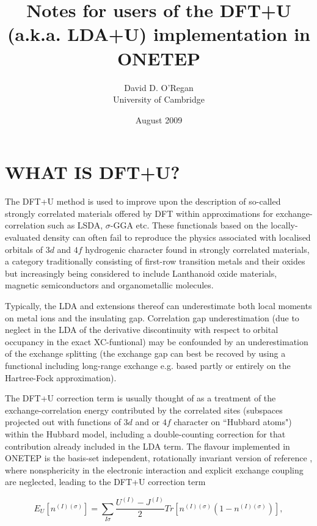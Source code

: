 \documentclass[a4paper,oneside,11pt]{article}
\numberwithin{equation}{section}
\begin{document}
\title{Notes for users of the DFT+U (a.k.a. LDA+U) implementation in ONETEP}
\author{David D. O'Regan \\  University of Cambridge}
\date{August 2009}

\maketitle

\section*{WHAT IS DFT+U?}

The DFT+U method \cite{Anisimov91,Anisimov97, Dudarev} is used to improve upon the description
of so-called strongly correlated materials offered by DFT within  
approximations for exchange-correlation such as LSDA, $\sigma$-GGA etc.
These functionals based on the locally-evaluated density can 
often fail to reproduce the physics associated with localised
orbitals of $3d$ and $4f$ hydrogenic character found in strongly 
correlated materials, a category traditionally consisting of first-row 
transition metals and their oxides but increasingly being considered to include
Lanthanoid oxide materials, magnetic semiconductors and
organometallic molecules. 

Typically, the LDA and extensions thereof
can underestimate both local moments on metal ions and the insulating gap. Correlation gap underestimation 
(due to neglect in the LDA of the derivative discontinuity 
with respect to orbital occupancy in the exact XC-funtional)
may be confounded by an underestimation of the exchange splitting
(the exchange gap can best be recoved by using a functional including
long-range exchange e.g. based partly or entirely on the Hartree-Fock approximation).

The DFT+U correction term is usually thought of
as a treatment of the exchange-correlation energy contributed 
by the correlated sites (subspaces projected out with functions 
of $3d$ and or $4f$ character on ``Hubbard atoms") within the Hubbard 
model, including a double-counting correction for that contribution
already included in the LDA term. The flavour implemented in 
ONETEP is the basis-set independent, rotationally invariant version
of reference \cite{Cococcioni1}, where nonsphericity in the electronic interaction
and explicit exchange coupling are neglected, leading
to the DFT+U correction term

\begin{equation}
E_U \left[ n^{(I) (\sigma)} \right] =  \sum_{I \sigma} \frac{U^{(I)}-J^{(I)}}{2} Tr \left[  n^{(I) (\sigma)} \left( 1 -  n^{(I) (\sigma)} \right)\right],
\end{equation}
\end{document}
